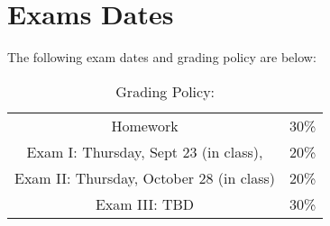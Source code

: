 \documentclass[11pt]{article}
\begin{document}
\section{Exams Dates} 
The following exam dates and grading policy are below:

\begin{table}[h!]
\caption{Grading Policy:}
\begin{center}
\begin{tabular}{cc}
Homework &30\%\\
Exam I:  Thursday, Sept 23 (in class),  &20\%\\
Exam  II: Thursday, October 28 (in class) & 20\%\\
Exam III:  TBD & 30\%\\
\end{tabular}
\end{center}
\label{default}
\end{table}%
\end{document}
